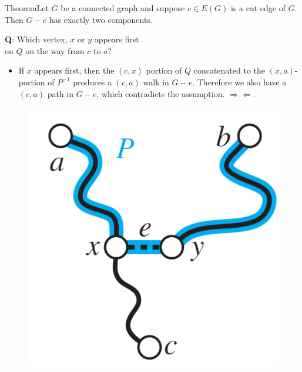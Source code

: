 \documentclass{beamer}
\def\bl[#1]#2{\begin{block}{#1}#2\end{block}}
\def\itemb{\begin{itemize}}
\def\iteme{\end{itemize}}
\begin{document}
\begin{frame}
\bl[Theorem]{Let $G$ be a connected graph and suppose $e\in E(G)$ is a cut edge of $G$. Then $G-e$ has exactly two components.} 
\textbf{Q}: Which vertex, $x$ or $y$ appears first \\ on $Q$ on the way from $c$ to $a$?

\itemb
\item If $x$ appears first, then the $(c,x)$ portion of $Q$ concatenated to the $(x,a)$-portion of $P^{-1}$ produces a $(c,a)$ walk in $G-e$. Therefore we also have a $(c,a)$ path in $G-e$, which contradicts the assumption. $\Rightarrow\Leftarrow$.
\iteme
\begin{figure}
\centering
\includegraphics[scale=0.25]{Xfirst.pdf}
\end{figure}
\end{frame}
\end{document}
